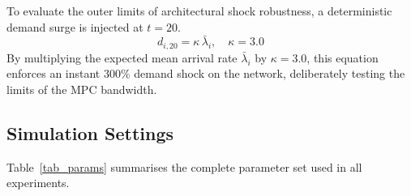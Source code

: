 \documentclass[journal]{IEEEtran}
\begin{document}
To evaluate the outer limits of architectural shock robustness, a deterministic demand surge is injected at $t = 20$.
\begin{equation}
    d_{i,20} = \kappa\,\bar{\lambda}_{i},\quad \kappa = 3.0
    \label{eq:shock}
\end{equation}
By multiplying the expected mean arrival rate $\bar{\lambda}_{i}$ by $\kappa = 3.0$, this equation enforces an instant 300\% demand shock on the network, deliberately testing the limits of the MPC bandwidth.

\subsection{Simulation Settings}
Table~\ref{tab_params} summarises the complete parameter set used in all
experiments.
\end{document}
